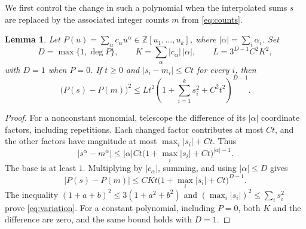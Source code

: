 \documentclass[11pt]{article}
\newtheorem{lemma}[theorem]{Lemma}
\begin{document}
We first control the change in such a polynomial when the interpolated
sums $s$ are replaced by the associated integer counts $m$ from
\eqref{eq:counts}.

\begin{lemma}\label{lem:variation}
Let $P(u)=\sum_\alpha c_\alpha u^\alpha\in\mathbb{Z}[u_1,\ldots,u_k]$,
where $|\alpha|=\sum_i\alpha_i$. Set
\[
 D=\max\{1,\deg P\},\qquad
 K=\sum_\alpha |c_\alpha|\,|\alpha|,\qquad
 L=3^{D-1}C^2K^2,
\]
with $D=1$ when $P=0$. If $t\geq0$ and $|s_i-m_i|\leq Ct$ for every $i$,
then
\begin{equation}\label{eq:variation}
 \bigl(P(s)-P(m)\bigr)^2
 \leq L t^2\left(1+\sum_{i=1}^k s_i^2+C^2t^2\right)^{D-1}.
\end{equation}
\end{lemma}

\begin{proof}
For a nonconstant monomial, telescope the difference of its $|\alpha|$
coordinate factors, including repetitions. Each changed factor contributes
at most $Ct$, and the other factors have magnitude at most
$\max_i|s_i|+Ct$. Thus
\[
 |s^\alpha-m^\alpha|
 \leq |\alpha|Ct\bigl(1+\max_i|s_i|+Ct\bigr)^{|\alpha|-1}.
\]
The base is at least $1$. Multiplying by $|c_\alpha|$, summing, and using
$|\alpha|\leq D$ gives
\[
 |P(s)-P(m)|\leq CKt\bigl(1+\max_i|s_i|+Ct\bigr)^{D-1}.
\]
The inequality $(1+a+b)^2\leq3(1+a^2+b^2)$ and
$(\max_i|s_i|)^2\leq\sum_i s_i^2$ prove \eqref{eq:variation}.
For a constant polynomial, including $P=0$, both $K$ and the difference are
zero, and the same bound holds with $D=1$.
\end{proof}
\end{document}

